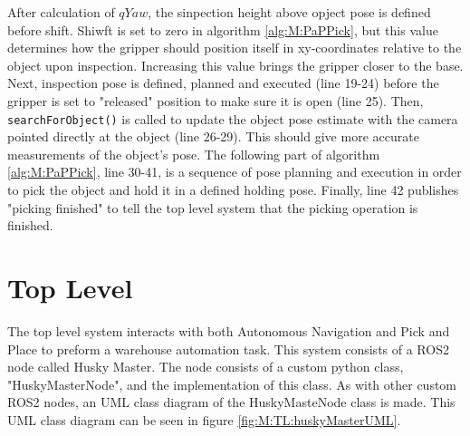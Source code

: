 After calculation of $qYaw$, the sinpection height above opject pose is defined before shift. Shiwft is set to zero in algorithm \ref{alg:M:PaPPick}, but this value determines how the gripper should position itself in xy-coordinates relative to the object upon inspection. Increasing this value brings the gripper closer to the base. Next, inspection pose is defined, planned and executed (line 19-24) before the gripper is set to "released" position to make sure it is open (line 25). Then, \lstinline{searchForObject()} is called to update the object pose estimate with the camera pointed directly at the object (line 26-29). This should give more accurate measurements of the object's pose. The following part of algorithm \ref{alg:M:PaPPick}, line 30-41, is a sequence of pose planning and execution in order to pick the object and hold it in a defined holding pose. Finally, line 42 publishes "picking finished" to tell the top level system that the picking operation is finished.



\section{Top Level} \label{M:TopLevel}

The top level system interacts with both Autonomous Navigation and Pick and Place to preform a warehouse automation task. This system consists of a ROS2 node called Husky Master. The node consists of a custom python class, "HuskyMasterNode", and the implementation of this class. As with other custom ROS2 nodes, an UML class diagram of the HuskyMasteNode class is made. This UML class diagram can be seen in figure \ref{fig:M:TL:huskyMasterUML}.


